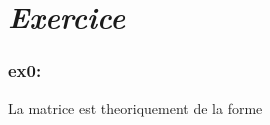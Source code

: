 \documentclass[French,Hoar.tex]{subfiles}
\begin{document}
  \section*{\emph{Exercice}}
  \subsubsection{ex0:}
  La matrice est theoriquement de la forme
\end{document}
